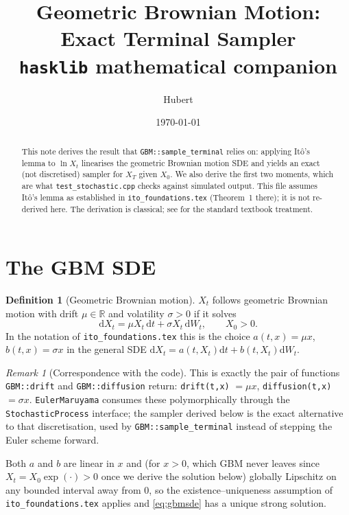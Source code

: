 \documentclass[11pt]{article}
\title{Geometric Brownian Motion: Exact Terminal Sampler\\
       \large \texttt{hasklib} mathematical companion}
\author{Hubert}
\date{\today}
\newcommand{\dd}{\mathrm{d}}
\newcommand{\dW}{\dd W_t}
\newcommand{\dt}{\dd t}
\newcommand{\R}{\mathbb{R}}
\newcommand{\drift}{a}
\newcommand{\diff}{b}
\theoremstyle{plain}
\theoremstyle{definition}
\newtheorem{definition}{Definition}
\theoremstyle{remark}
\newtheorem{remark}{Remark}
\begin{document}
\maketitle

\begin{abstract}
This note derives the result that \texttt{GBM::sample\_terminal} relies
on: applying It\^o's lemma to $\ln X_t$ linearises the geometric
Brownian motion SDE and yields an exact (not discretised) sampler for
$X_T$ given $X_0$. We also derive the first two moments, which are
what \texttt{test\_stochastic.cpp} checks against simulated output.
This file assumes It\^o's lemma as established in
\texttt{ito\_foundations.tex} (Theorem~1 there); it is not re-derived
here. The derivation is classical; see  for the
standard textbook treatment.
\end{abstract}

\section{The GBM SDE}

\begin{definition}[Geometric Brownian motion]\label{def:gbm}
$X_t$ follows geometric Brownian motion with drift $\mu\in\R$ and
volatility $\sigma>0$ if it solves
\begin{equation}\label{eq:gbmsde}
   \dd X_t = \mu X_t\,\dt + \sigma X_t\,\dW, \qquad X_0>0.
\end{equation}
In the notation of \texttt{ito\_foundations.tex} this is the choice
$\drift(t,x)=\mu x$, $\diff(t,x)=\sigma x$ in the general SDE
$\dd X_t = \drift(t,X_t)\dt+\diff(t,X_t)\dW$.
\end{definition}

\begin{remark}[Correspondence with the code]
This is exactly the pair of functions \texttt{GBM::drift} and
\texttt{GBM::diffusion} return: \texttt{drift(t,x)} $=\mu x$,
\texttt{diffusion(t,x)} $=\sigma x$. \texttt{EulerMaruyama} consumes
these polymorphically through the \texttt{StochasticProcess}
interface; the sampler derived below is the exact alternative
to that discretisation, used by \texttt{GBM::sample\_terminal} instead
of stepping the Euler scheme forward.
\end{remark}

Both $\drift$ and $\diff$ are linear in $x$ and (for $x>0$, which GBM
never leaves since $X_t=X_0\exp(\cdot)>0$ once we derive the solution
below) globally Lipschitz on any bounded interval away from $0$, so the
existence--uniqueness assumption of \texttt{ito\_foundations.tex}
applies and \eqref{eq:gbmsde} has a unique strong solution.
\end{document}
